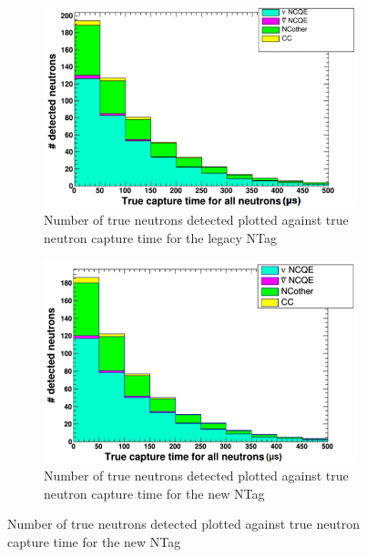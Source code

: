 \begin{figure}
    \centering
     \begin{subfigure}[b]{0.45\linewidth}
      \includegraphics[width=\linewidth]{Figures/TrueCapTimeReductionLegacy.PNG}
      \caption{Number of true neutrons detected plotted against true neutron capture time for the legacy NTag}
      \label{fig:TruCapTimeReductionLegacy} 
     \end{subfigure}
     \begin{subfigure}[b]{0.45\linewidth}
       \includegraphics[width=\linewidth]{Figures/TrueCapTimeReductionNew.PNG}
        \caption{Number of true neutrons detected plotted against true neutron capture time for the new NTag } 
     \label{fig:TruCapTimeReductionNew}
      \end{subfigure} 
\end{figure}

